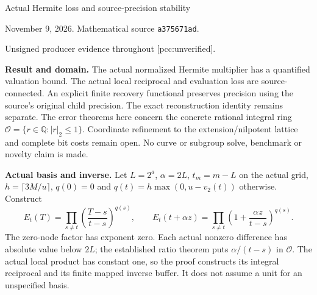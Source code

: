 \documentclass[11pt]{article}
\begin{document}
{\LARGE Actual Hermite loss and source-precision stability}\par
November 9, 2026. Mathematical source \texttt{a375671ad}.\par
Unsigned producer evidence throughout [pcc:unverified].

\textbf{Result and domain.}
The actual normalized Hermite multiplier has a quantified valuation bound.
The actual local reciprocal and evaluation loss are source-connected. An
explicit finite recovery functional preserves precision using the source's
original child precision. The exact reconstruction identity remains separate.
The error theorems here concern the concrete rational integral ring
$\mathcal O=\{r\in\mathbb Q:|r|_2\leq1\}$. Coordinate refinement to the
extension/nilpotent lattice and complete bit costs remain open. No curve or
subgroup solve, benchmark or novelty claim is made.

\textbf{Actual basis and inverse.}
Let $L=2^a$, $\alpha=2L$, $t_m=m-L$ on the actual grid,
$h=\lceil3M/u\rceil$, $q(0)=0$ and
$q(t)=h\max(0,u-v_2(t))$ otherwise. Construct
\[
 E_t(T)=\prod_{s\ne t}\left(\frac{T-s}{t-s}\right)^{q(s)},\qquad
 E_t(t+\alpha z)=\prod_{s\ne t}\left(1+\frac{\alpha z}{t-s}\right)^{q(s)}.
\]
The zero-node factor has exponent zero. Each actual nonzero difference has
absolute value below $2L$; the established ratio theorem puts
$\alpha/(t-s)$ in $\mathcal O$. The actual local product has constant one,
so the proof constructs its integral reciprocal and its finite mapped inverse
buffer. It does not assume a unit for an unspecified basis.
\end{document}
